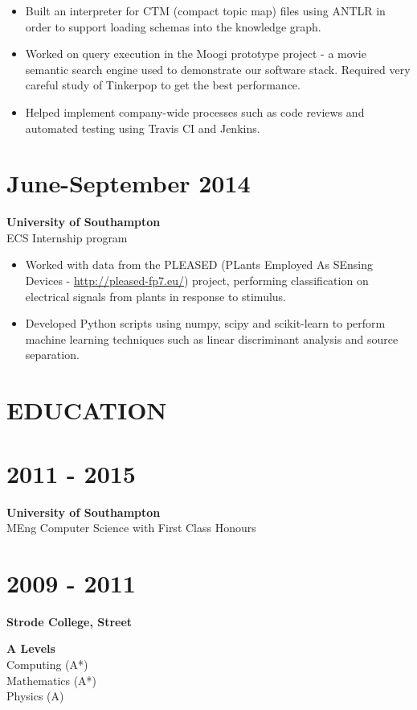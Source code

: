 \documentclass[margin]{res}
\begin{document}
\begin{resume}
\begin{itemize}
\item
Built an interpreter for CTM (compact topic map) files using ANTLR in order to support loading schemas into the knowledge graph.

\item
Worked on query execution in the Moogi prototype project - a movie semantic search engine used to demonstrate our software stack. Required very careful study of Tinkerpop to get the best performance.

\item
Helped implement company-wide processes such as code reviews and automated testing using Travis CI and Jenkins.

\end{itemize}

\normalsize{\section{June-September 2014}}
{\bf University of Southampton} \\
ECS Internship program \\
\begin{itemize}
\item
Worked with data from the PLEASED
(PLants Employed As SEnsing Devices - \href{http://pleased-fp7.eu/}{http://pleased-fp7.eu/}) project, performing classification on electrical signals from plants in response to stimulus.
\item
Developed Python scripts using numpy, scipy and scikit-learn to perform machine learning techniques such as linear discriminant analysis and source separation.
\end{itemize}

\pagebreak
\section{EDUCATION}
\normalsize{\section{2011 - 2015}}
{\bf University of Southampton} \\
MEng Computer Science with First Class Honours \\
\normalsize{\section{2009 - 2011}}
{\bf Strode College, Street}

{\bf A Levels} \\
Computing (A*) \\
Mathematics (A*) \\
Physics (A)


\end{resume}
\end{document}
